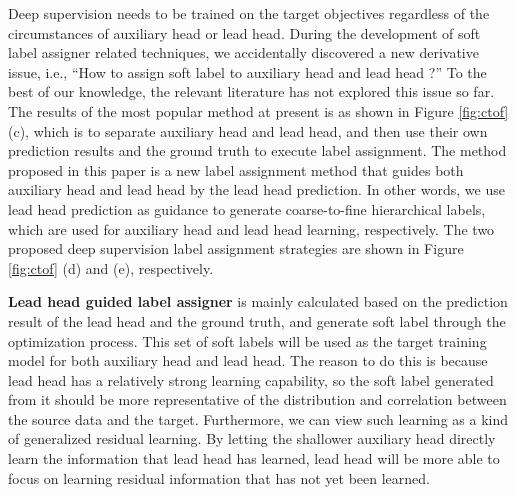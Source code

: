\documentclass[10pt,twocolumn,letterpaper]{article}
\begin{document}
		Deep supervision needs to be trained on the target objectives regardless of the circumstances of auxiliary head or lead head.  During the development of soft label assigner related techniques, we accidentally discovered a new derivative issue, i.e., ``How to assign soft label to auxiliary head and lead head ?''  To the best of our knowledge, the relevant literature has not explored this issue so far.  The results of the most popular method at present is as shown in Figure \ref{fig:ctof} (c), which is to separate auxiliary head and lead head, and then use their own prediction results and the ground truth to execute label assignment.  The method proposed in this paper is a new label assignment method that guides both auxiliary head and lead head by the lead head prediction.  In other words, we use lead head prediction as guidance to generate coarse-to-fine hierarchical labels, which are used for auxiliary head and lead head learning, respectively.  The two proposed deep supervision label assignment strategies are shown in Figure \ref{fig:ctof} (d) and (e), respectively.
				
		\textbf{Lead head guided label assigner} is mainly calculated based on the prediction result of the lead head and the ground truth, and generate soft label through the optimization process.  This set of soft labels will be used as the target training model for both auxiliary head and lead head.  The reason to do this is because lead head has a relatively strong learning capability, so the soft label generated from it should be more representative of the distribution and correlation between the source data and the target.  Furthermore, we can view such learning as a kind of generalized residual learning.  By letting the shallower auxiliary head directly learn the information that lead head has learned, lead head will be more able to focus on learning residual information that has not yet been learned.
		
\end{document}
